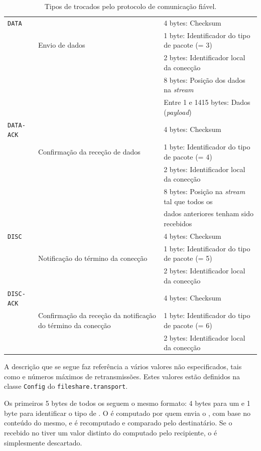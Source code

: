 \begin{table}[ht]
\begin{tabularx}{\textwidth}{|l|X|l|}
    \texttt{DATA}
     & \multirow[t]{3}{=}{Envio de dados}
       & 4 bytes: Checksum \\
     & & 1 byte: Identificador do tipo de pacote (= 3) \\
     & & 2 bytes: Identificador local da conecção \\
     & & 8 bytes: Posição dos dados na \emph{stream} \\
     & & Entre 1 e 1415 bytes: Dados (\emph{payload}) \\
    \hline
    
    \texttt{DATA-ACK}
     & \multirow[t]{3}{=}{Confirmação da receção de dados}
       & 4 bytes: Checksum \\
     & & 1 byte: Identificador do tipo de pacote (= 4) \\
     & & 2 bytes: Identificador local da conecção \\
     & & 8 bytes: Posição na \emph{stream} tal que todos os \\
     & & \hfill dados anteriores tenham sido recebidos \\
    \hline
    
    \texttt{DISC}
     & \multirow[t]{3}{=}{Notificação do término da conecção}
       & 4 bytes: Checksum \\
     & & 1 byte: Identificador do tipo de pacote (= 5) \\
     & & 2 bytes: Identificador local da conecção \\
    \hline
    
    \texttt{DISC-ACK}
     & \multirow[t]{3}{=}{Confirmação da receção da notificação do término da conecção}
       & 4 bytes: Checksum \\
     & & 1 byte: Identificador do tipo de pacote (= 6) \\
     & & 2 bytes: Identificador local da conecção \\
    \hline
    
  \end{tabularx}
  \caption{Tipos de  trocados pelo protocolo de comunicação fiável.}
  \label{tbl:impl:tipos-packets}
\end{table}

A descrição que se segue faz referência a vários valores não especificados, tais como  e números máximos de retransmissões. Estes valores estão definidos na classe \texttt{Config} do  \texttt{fileshare.transport}.

Os primeiros 5 bytes de todos os  seguem o mesmo formato: 4 bytes para um  e 1 byte para identificar o tipo de . O  é computado por quem envia o , com base no conteúdo do mesmo, e é recomputado e comparado pelo destinatário. Se o  recebido no  tiver um valor distinto do computado pelo recipiente, o  é simplesmente descartado.

